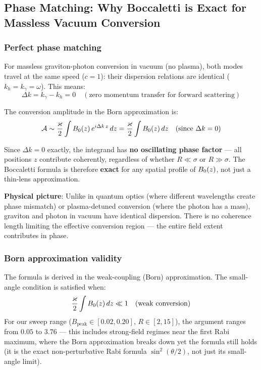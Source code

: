 \subsection{Phase Matching: Why Boccaletti is Exact for Massless Vacuum Conversion}
\label{sec:phase-matching}

\subsubsection{Perfect phase matching}

For massless graviton-photon conversion in vacuum (no plasma), both modes travel at the same
speed ($c = 1$): their dispersion relations are identical ($k_h = k_\gamma = \omega$). This means:
\begin{equation}
  \Delta k = k_\gamma - k_h = 0 \quad (\text{zero momentum transfer for forward scattering})
\end{equation}

The conversion amplitude in the Born approximation is:
\begin{equation}
  \mathcal{A} \sim \frac{\varkappa}{2} \int B_0(z)\, e^{i \Delta k\, z}\, dz = \frac{\varkappa}{2} \int B_0(z)\, dz \quad (\text{since } \Delta k = 0)
\end{equation}

Since $\Delta k = 0$ exactly, the integrand has \textbf{no oscillating phase factor} --- all positions $z$
contribute coherently, regardless of whether $R \ll \sigma$ or $R \gg \sigma$. The Boccaletti formula is
therefore \textbf{exact} for any spatial profile of $B_0(z)$, not just a thin-lens approximation.

\textbf{Physical picture}: Unlike in quantum optics (where different wavelengths create phase
mismatch) or plasma-detuned conversion (where the photon has a mass), graviton and photon
in vacuum have identical dispersion. There is no coherence length limiting the effective
conversion region --- the entire field extent contributes in phase.

\subsubsection{Born approximation validity}

The formula is derived in the weak-coupling (Born) approximation. The small-angle condition
is satisfied when:
\begin{equation}
  \frac{\varkappa}{2} \int B_0(z)\, dz \ll 1 \quad (\text{weak conversion})
\end{equation}
For our sweep range ($B_\text{peak} \in [0.02, 0.20]$, $R \in [2, 15]$), the argument ranges from $0.05$ to
$3.76$ --- this includes strong-field regimes near the first Rabi maximum, where the Born
approximation breaks down yet the formula still holds (it is the exact non-perturbative Rabi
formula $\sin^2(\theta/2)$, not just its small-angle limit).

